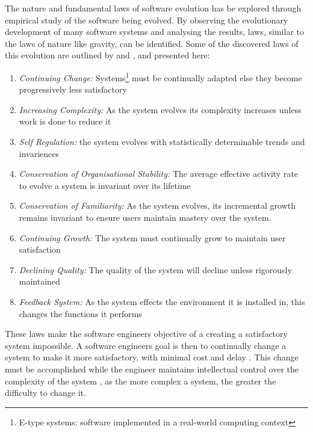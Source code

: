 The nature and fundamental laws of software evolution has be explored through empirical study of the software being evolved.
By observing the evolutionary development of many software systems and analysing the results, laws, similar to the laws of nature like gravity, can be identified.
Some of the discovered laws of this evolution are outlined by \cite{lehman1980} and \cite{lehman1997}, and presented here:

\begin{enumerate}
  \item \textit{Continuing Change:} Systems\footnote{E-type systems: software implemented in a real-world computing context} must be continually adapted else they become progressively less satisfactory
  \item \textit{Increasing Complexity:} As the system evolves its complexity increases unless work is done to reduce it
  \item \textit{Self Regulation:} the system evolves with statistically determinable trends and invariences
  \item \textit{Conservation of Organisational Stability:} The average effective activity rate to evolve a system is invariant over its lifetime
  \item \textit{Conservation of Familiarity:} As the system evolves, its incremental growth remains invariant to ensure users maintain mastery over the system.
  \item \textit{Continuing Growth:} The system must continually grow to maintain user satisfaction
  \item \textit{Declining Quality:} The quality of the system will decline unless rigorously maintained
  \item \textit{Feedback System:} As the system effects the environment it is installed in, this changes the functions it performs
\end{enumerate}

These laws make the software engineers objective of a creating a satisfactory system impossible.
A software engineers goal is then to continually change a system to make it more satisfactory, with minimal cost and delay \cite{Lehman2006}.
This change must be accomplished while the engineer maintains intellectual control over the complexity of the system \cite{Brooks1975}, 
as the more complex a system, the greater the difficulty to change it.


